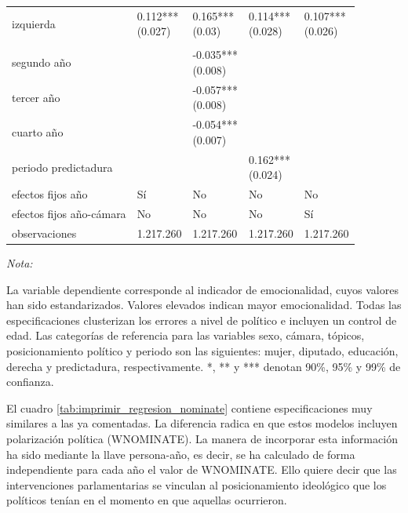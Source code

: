 \documentclass[
  12pt,
]{article}
\begin{document}
\begin{table}[H]
\begin{threeparttable}
\begin{tabular}[t]{lllll}
\hspace{1em}izquierda & \makecell[l]{0.112***\\ (0.027)} & \makecell[l]{0.165***\\ (0.03)} & \makecell[l]{0.114***\\ (0.028)} & \makecell[l]{0.107***\\ (0.026)}\\
\addlinespace[0.3em]
\multicolumn{5}{l}{\textbf{Periodo parlamentario}}\\
\hspace{1em}segundo año &  & \makecell[l]{-0.035***\\ (0.008)} &  & \\
\hspace{1em}tercer año &  & \makecell[l]{-0.057***\\ (0.008)} &  & \\
\hspace{1em}cuarto año &  & \makecell[l]{-0.054***\\ (0.007)} &  & \\
periodo predictadura &  &  & \makecell[l]{0.162***\\ (0.024)} & \\
efectos fijos año & Sí & No & No & No\\
efectos fijos año-cámara & No & No & No & Sí\\
observaciones & 1.217.260 & 1.217.260 & 1.217.260 & 1.217.260\\
\bottomrule
\end{tabular}
\begin{tablenotes}[para]
\item \textit{Nota:} 
\item La variable dependiente corresponde al indicador de emocionalidad, cuyos valores han sido estandarizados. Valores elevados indican mayor emocionalidad. Todas las especificaciones clusterizan los errores a nivel de político e incluyen un control de edad. Las categorías de referencia para las variables sexo, cámara, tópicos, posicionamiento político y periodo son las siguientes: mujer, diputado, educación, derecha y predictadura, respectivamente. *, ** y *** denotan 90\%, 95\% y 99\% de confianza.
\end{tablenotes}
\end{threeparttable}
\end{table}

El cuadro \ref{tab:imprimir_regresion_nominate} contiene
especificaciones muy similares a las ya comentadas. La diferencia radica
en que estos modelos incluyen polarización política (WNOMINATE). La
manera de incorporar esta información ha sido mediante la llave
persona-año, es decir, se ha calculado de forma independiente para cada
año el valor de WNOMINATE. Ello quiere decir que las intervenciones
parlamentarias se vinculan al posicionamiento ideológico que los
políticos tenían en el momento en que aquellas ocurrieron.
\end{document}

